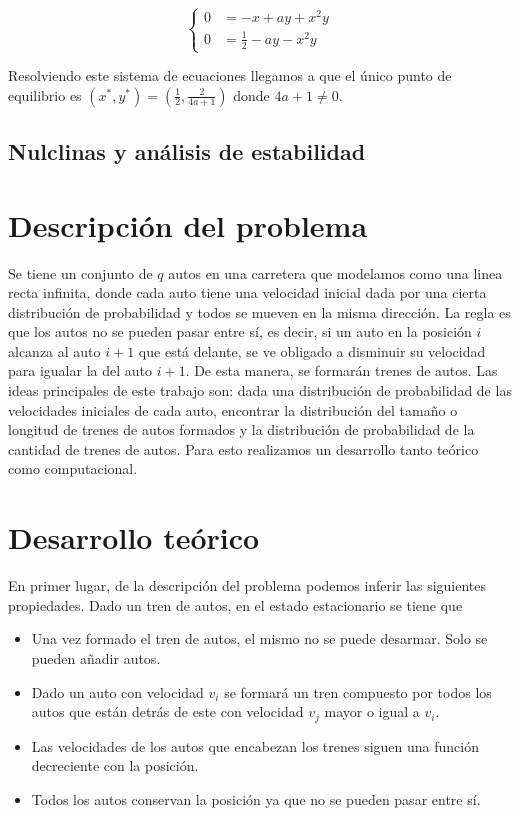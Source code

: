 \documentclass[letterpaper,12pt]{article}
\theoremstyle{plain}
\begin{document}
\begin{equation}
    \begin{cases}
    0 &= -x + ay + x^2 y \\
    0 &= \frac{1}{2} - ay - x^2 y
    \end{cases}
\end{equation}

Resolviendo este sistema de ecuaciones llegamos a que el único punto de equilibrio es $(x^*, y^*) = \left(\frac{1}{2}, \frac{2}{4a +1}\right)$ donde $4a+1 \neq 0$. 

\subsection{Nulclinas y análisis de estabilidad}















\section{Descripción del problema}

Se tiene un conjunto de $q$ autos en una carretera que modelamos como una linea recta infinita, donde cada auto tiene una velocidad inicial dada por una cierta distribución de probabilidad y todos se mueven en la misma dirección. La regla es que los autos no se pueden pasar entre sí, es decir, si un auto en la posición $i$ alcanza al auto $i+1$ que está delante, se ve obligado a disminuir su velocidad para igualar la del auto $i+1$. De esta manera, se formarán trenes de autos. Las ideas principales de este trabajo son: dada una distribución de probabilidad de las velocidades iniciales de cada auto, encontrar la distribución del tamaño o longitud de trenes de autos formados y la distribución de probabilidad de la cantidad de trenes de autos. Para esto realizamos un desarrollo tanto teórico como computacional.


\section{Desarrollo teórico}

En primer lugar, de la descripción del problema podemos inferir las siguientes propiedades. Dado un tren de autos, en el estado estacionario se tiene que 
\begin{itemize}
    \item Una vez formado el tren de autos, el mismo no se puede desarmar. Solo se pueden añadir autos.
    \item Dado un auto con velocidad $v_i$ se formará un tren compuesto por todos los autos que están detrás de este con velocidad $v_j$ mayor o igual a $v_i$.
    \item Las velocidades de los autos que encabezan los trenes siguen una función decreciente con la posición.
    \item Todos los autos conservan la posición ya que no se pueden pasar entre sí.
\end{itemize}
\end{document}

